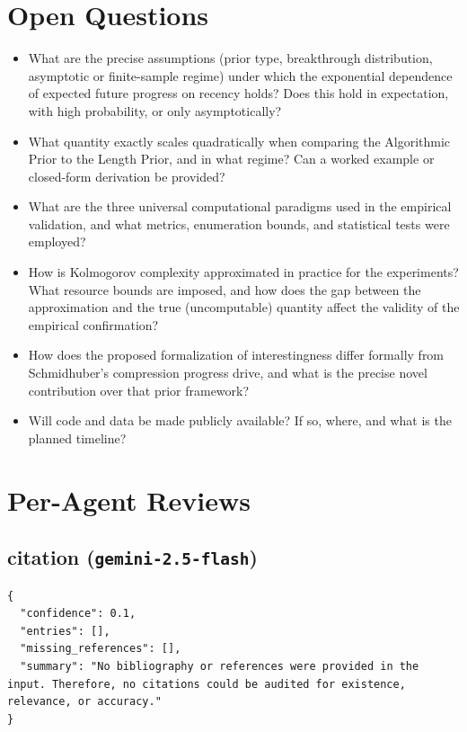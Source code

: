 \documentclass[11pt]{article}
\begin{document}
\section*{Open Questions}
\begin{itemize}[leftmargin=*]
  \item What are the precise assumptions (prior type, breakthrough distribution, asymptotic or finite-sample regime) under which the exponential dependence of expected future progress on recency holds? Does this hold in expectation, with high probability, or only asymptotically?
  \item What quantity exactly scales quadratically when comparing the Algorithmic Prior to the Length Prior, and in what regime? Can a worked example or closed-form derivation be provided?
  \item What are the three universal computational paradigms used in the empirical validation, and what metrics, enumeration bounds, and statistical tests were employed?
  \item How is Kolmogorov complexity approximated in practice for the experiments? What resource bounds are imposed, and how does the gap between the approximation and the true (uncomputable) quantity affect the validity of the empirical confirmation?
  \item How does the proposed formalization of interestingness differ formally from Schmidhuber's compression progress drive, and what is the precise novel contribution over that prior framework?
  \item Will code and data be made publicly available? If so, where, and what is the planned timeline?
\end{itemize}

\section*{Per-Agent Reviews}
\subsection*{citation (\texttt{gemini-2.5-flash})}
\begin{verbatim}
{
  "confidence": 0.1,
  "entries": [],
  "missing_references": [],
  "summary": "No bibliography or references were provided in the input. Therefore, no citations could be audited for existence, relevance, or accuracy."
}
\end{verbatim}
\end{document}
